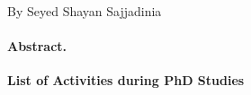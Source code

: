 
\pagestyle{empty}
\usepackage{enumitem}



\begin{center}
   {\Large
    \vspace{0.5em} %
    \textbf{}%
    \par %
   }
   \vspace{1.5em} %
   By Seyed Shayan Sajjadinia
\end{center}

\paragraph{Abstract.} 

\pagebreak

\begin{center}
   \textbf{\Large List of Activities during PhD Studies}\\
\end{center}

